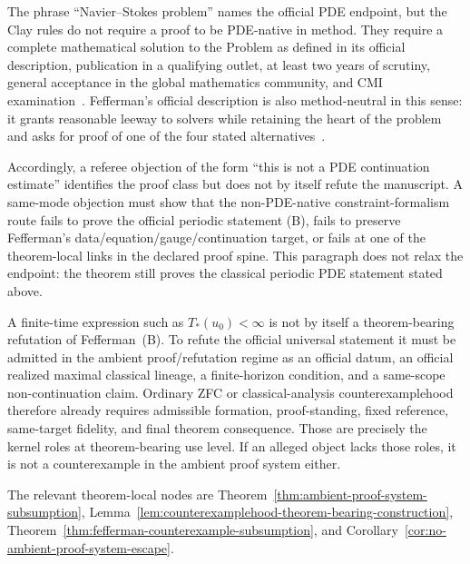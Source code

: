 \begin{tcolorbox}[breakable, title={Clay rules do not require a PDE-native proof method}, colback=yellow!2!white, colframe=orange!65!black]
The phrase ``Navier--Stokes problem'' names the official PDE endpoint, but the Clay rules do not require a proof to be PDE-native in method. They require a complete mathematical solution to the Problem as defined in its official description, publication in a qualifying outlet, at least two years of scrutiny, general acceptance in the global mathematics community, and CMI examination~\cite{cmi-millennium-rules}. Fefferman's official description is also method-neutral in this sense: it grants reasonable leeway to solvers while retaining the heart of the problem and asks for proof of one of the four stated alternatives~\cite{fefferman-navierstokes-problem}.

\medskip
Accordingly, a referee objection of the form ``this is not a PDE continuation estimate'' identifies the proof class but does not by itself refute the manuscript. A same-mode objection must show that the non-PDE-native constraint-formalism route fails to prove the official periodic statement (B), fails to preserve Fefferman's data/equation/gauge/continuation target, or fails at one of the theorem-local links in the declared proof spine. This paragraph does not relax the endpoint: the theorem still proves the classical periodic PDE statement stated above.
\end{tcolorbox}

\begin{tcolorbox}[breakable, title={Counterexamplehood lock}, colback=cyan!2!white, colframe=cyan!55!black]
A finite-time expression such as $T_*(u_0)<\infty$ is not by itself a theorem-bearing refutation of Fefferman~(B). To refute the official universal statement it must be admitted in the ambient proof/refutation regime as an official datum, an official realized maximal classical lineage, a finite-horizon condition, and a same-scope non-continuation claim. Ordinary ZFC or classical-analysis counterexamplehood therefore already requires admissible formation, proof-standing, fixed reference, same-target fidelity, and final theorem consequence. Those are precisely the kernel roles at theorem-bearing use level. If an alleged object lacks those roles, it is not a counterexample in the ambient proof system either.

\medskip
The relevant theorem-local nodes are Theorem~\ref{thm:ambient-proof-system-subsumption}, Lemma~\ref{lem:counterexamplehood-theorem-bearing-construction}, Theorem~\ref{thm:fefferman-counterexample-subsumption}, and Corollary~\ref{cor:no-ambient-proof-system-escape}.
\end{tcolorbox}

